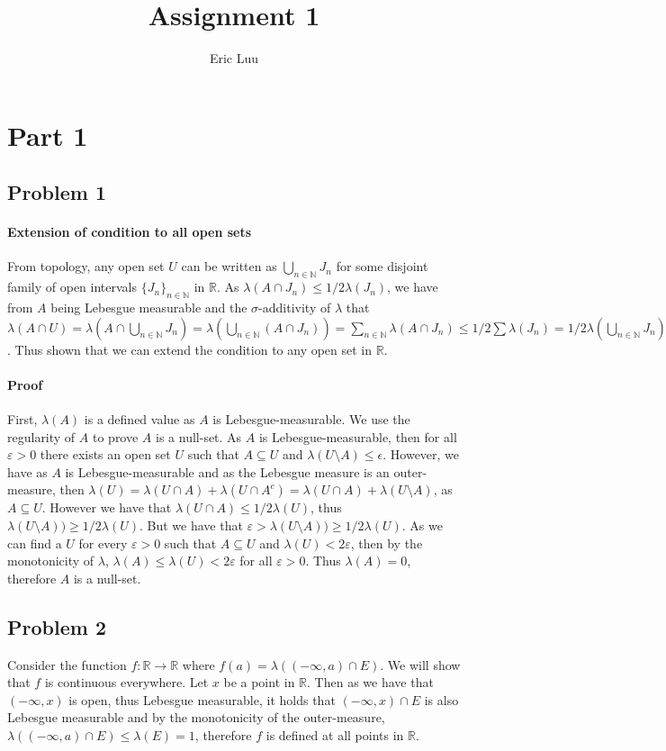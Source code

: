 \documentclass{article}
\title{Assignment 1}
\author{Eric Luu}
\theoremstyle{definition}
\numberwithin{theorem}{section}
\numberwithin{equation}{section}
\begin{document}
\maketitle
\section{Part 1}
\subsection{Problem 1}
\paragraph{Extension of condition to all open sets}
From topology, any open set $U$ can be written as $\bigcup_{n \in \mathbb{N}} J_n$ for some disjoint family of open intervals $\lbrace J_n \rbrace_{n \in \mathbb{N}}$ in $\mathbb{R}$. As $\lambda(A \cap J_n) \leq 1/2 \lambda(J_n)$, we have from $A$ being Lebesgue measurable and the $\sigma$-additivity of $\lambda$ that $ \lambda(A \cap U) = \lambda(A \cap \bigcup_{n \in \mathbb{N}} J_n)= \lambda(\bigcup_{n \in \mathbb{N}} (A \cap J_n)) =\sum_{n \in \mathbb{N}} \lambda(A \cap J_n) \leq 1/2 \sum \lambda(J_n) = 1/2 \lambda(\bigcup_{n \in \mathbb{N}} J_n) = 1/2 \lambda(U)$. Thus shown that we can extend the condition to any open set in $\mathbb{R}$. 
\paragraph{Proof}
First, $\lambda(A)$ is a defined value as $A$ is Lebesgue-measurable. We use the regularity of $A$ to prove $A$ is a null-set. As $A$ is Lebesgue-measurable, then for all $\varepsilon > 0$ there exists an open set $U$ such that $A \subseteq U$ and $\lambda(U\setminus A) \leq \epsilon$. However, we have as $A$ is Lebesgue-measurable and as the Lebesgue measure is an outer-measure, then $\lambda(U) = \lambda(U \cap A) + \lambda(U \cap A^c) = \lambda(U \cap A) + \lambda(U \setminus A)$, as $A \subseteq U$. However we have that $\lambda(U \cap A) \leq 1/2 \lambda(U)$, thus $\lambda(U \setminus A)) \geq 1/2 \lambda(U)$. But we have that $\varepsilon> \lambda(U \setminus A)) \geq 1/2 \lambda(U)$. As we can find a $U$ for every $\varepsilon> 0$ such that $A \subseteq U$ and $\lambda(U) < 2 \varepsilon$, then by the monotonicity of $\lambda$, $\lambda(A) \leq \lambda(U) < 2 \varepsilon$ for all $\varepsilon > 0$. Thus $\lambda(A) = 0$, therefore $A$ is a null-set.  
\subsection{Problem 2}
Consider the function $f: \mathbb{R} \rightarrow \mathbb{R}$ where $f(a) = \lambda((-\infty, a) \cap E)$. We will show that $f$ is continuous everywhere. Let $x$ be a point in $\mathbb{R}$. Then as we have that $(-\infty, x)$ is open, thus Lebesgue measurable, it holds that $(-\infty, x) \cap E$ is also Lebesgue measurable and by the monotonicity of the outer-measure, $\lambda((-\infty, a) \cap E) \leq \lambda(E) = 1$, therefore $f$ is defined at all points in $\mathbb{R}$. 
\end{document}
